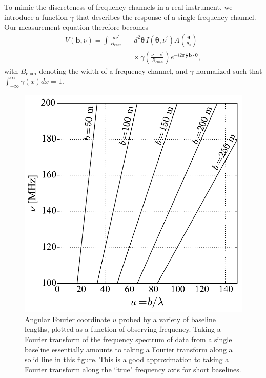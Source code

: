 \documentclass[twocolumn,aps,prd,nofootinbib,showpacs]{revtex4-1}
\begin{document}
To mimic the discreteness of frequency channels in a real instrument, we introduce a function $\gamma$ that describes the response of a single frequency channel.  Our measurement equation therefore becomes
\begin{eqnarray}
\label{eq:measEqn}
V(\mathbf{b}, \nu) = \int   \frac{d\nu^\prime}{B_\textrm{chan}} && d^2 \boldsymbol{\theta} \, I (\boldsymbol \theta, \nu^\prime)  A \left( \frac{\boldsymbol \theta}{\theta_0} \right) \nonumber \\
&& \times \, \gamma\left( \frac{\nu-\nu^\prime}{B_\textrm{chan}} \right)   e^{ - i 2 \pi \frac{\nu^\prime}{c} \mathbf{b} \cdot \boldsymbol \theta }  ,
\end{eqnarray}
with $B_\textrm{chan}$ denoting the width of a frequency channel, and $\gamma$ normalized such that $\int_{-\infty}^\infty  \gamma (x) dx = 1$.

\begin{figure}[t!] 
	\centering 
	\includegraphics[width=.4\textwidth]{figures/chromaticBaselines.pdf}
	\caption{Angular Fourier coordinate $u$ probed by a variety of baseline lengths, plotted as a function of observing frequency.  Taking a Fourier transform of the frequency spectrum of data from a single baseline essentially amounts to taking a Fourier transform along a solid line in this figure.  This is a good approximation to taking a Fourier transform along the ``true" frequency axis for short baselines.}
	\label{fig:ChromaticBaselines}
\end{figure} 
\end{document}
